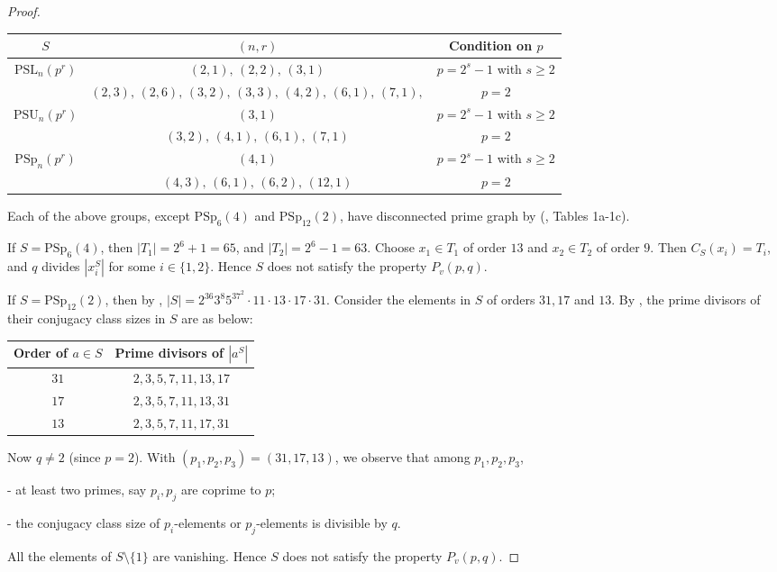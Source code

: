\documentclass[11pt, a4paper]{article}
\numberwithin{equation}{section}
\theoremstyle{plain} %
\begin{document}
\begin{proof}
 \begin{center}
\begin{tabular}{|c|c|c|}\hline 
$S$ & $(n,r)$ & Condition on $p$\\\hline
$\mathrm{PSL}_n(p^r)$ & $(2,1), \,(2,2),\,(3,1)$ & $p=2^s-1$ with $s\geq 2$ \\
& $(2,3),\,(2,6),\,(3,2),\,(3,3),\,(4,2),\,(6,1),\, (7,1),$ & $p=2$ \\\hline
$\mathrm{PSU}_n(p^r)$ & $(3,1)$ & $p=2^s-1$ with $s\geq 2$\\
& $(3,2),\,(4,1),\,(6,1),\,(7,1)$ & $p=2$ \\\hline
$\mathrm{PSp}_n(p^r)$ & $(4,1)$ & $p=2^s-1$ with $s\geq 2$ \\
& $(4,3),\,(6,1),\,(6,2),\,(12,1)$ & $p=2$ \\\hline
\end{tabular}
 \end{center}
Each of the above groups, except $\mathrm{PSp}_6(4)$ and $\mathrm{PSp}_{12}(2)$, have disconnected prime graph by (\cite{MR1922988}, Tables 1a-1c). 

If $S=\mathrm{PSp}_6(4)$, then $|T_1|=2^6+1=65$, and $|T_2|=2^6-1=63$. Choose $x_1\in T_1$ of order $13$ and $x_2\in T_2$ of order $9$. Then $C_S(x_i)=T_i$, and $q$ divides $|x_i^S|$ for some $i\in \{1,2\}$.  Hence $S$ does not satisfy the property $P_v(p,q)$. 

If $S=\mathrm{PSp}_{12}(2)$, then by \cite{GAP4}, $|S|=2^{36}3^{8}5^37^2\cdot 11\cdot 13\cdot 17\cdot 31$. Consider the elements in $S$ of orders $31,17$ and $13$. By \cite{GAP4}, the prime divisors of their conjugacy class sizes in $S$ are as below: 
\begin{center}
\begin{tabular}{|c|c|}\hline 
Order of $a\in S$ & Prime divisors of $|a^S|$ \\\hline 
$31$ & $2,3,5,7,11,13,17$ \\
$17$ & $2,3,5,7,11,13,31$ \\ 
$13$ & $2,3,5,7,11,17,31$\\\hline 
\end{tabular}
\end{center}
Now $q\neq 2$ (since $p=2$). With $(p_1,p_2,p_3)=(31,17,13)$, we observe that among $p_1,p_2,p_3$, 

- at least two primes, say $p_i,p_j$ are coprime to $p$; 

- the conjugacy class size of $p_i$-elements or $p_j$-elements is divisible by $q$.

All the elements of $S\setminus\{1\}$ are vanishing. Hence $S$ does not satisfy the property $P_v(p,q)$. 
\end{proof}
\end{document}
